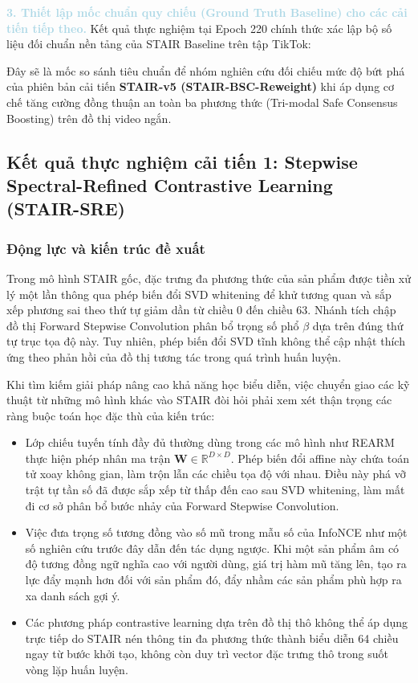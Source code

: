 \noindent\textcolor{lightblue}{\textbf{3. Thiết lập mốc chuẩn quy chiếu (Ground Truth Baseline) cho các cải tiến tiếp theo.}}
Kết quả thực nghiệm tại Epoch 220 chính thức xác lập bộ số liệu đối chuẩn nền tảng của STAIR Baseline trên tập TikTok:
\begin{center}
\end{center}
Đây sẽ là mốc so sánh tiêu chuẩn để nhóm nghiên cứu đối chiếu mức độ bứt phá của phiên bản cải tiến \textbf{STAIR-v5 (STAIR-BSC-Reweight)} khi áp dụng cơ chế tăng cường đồng thuận an toàn ba phương thức (Tri-modal Safe Consensus Boosting) trên đồ thị video ngắn.

\subsection{Kết quả thực nghiệm cải tiến 1: Stepwise Spectral-Refined Contrastive Learning (STAIR-SRE)}
\label{sec:stair_sre}

\subsubsection{Động lực và kiến trúc đề xuất}

Trong mô hình STAIR gốc, đặc trưng đa phương thức của sản phẩm được tiền xử lý một lần thông qua phép biến đổi SVD whitening để khử tương quan và sắp xếp phương sai theo thứ tự giảm dần từ chiều 0 đến chiều 63. Nhánh tích chập đồ thị Forward Stepwise Convolution phân bổ trọng số phổ $\beta$ dựa trên đúng thứ tự trục tọa độ này. Tuy nhiên, phép biến đổi SVD tĩnh không thể cập nhật thích ứng theo phản hồi của đồ thị tương tác trong quá trình huấn luyện.

Khi tìm kiếm giải pháp nâng cao khả năng học biểu diễn, việc chuyển giao các kỹ thuật từ những mô hình khác vào STAIR đòi hỏi phải xem xét thận trọng các ràng buộc toán học đặc thù của kiến trúc:
\begin{itemize}[leftmargin=*]
    \item Lớp chiếu tuyến tính đầy đủ thường dùng trong các mô hình như REARM thực hiện phép nhân ma trận $\mathbf{W} \in \mathbb{R}^{D \times D}$. Phép biến đổi affine này chứa toán tử xoay không gian, làm trộn lẫn các chiều tọa độ với nhau. Điều này phá vỡ trật tự tần số đã được sắp xếp từ thấp đến cao sau SVD whitening, làm mất đi cơ sở phân bổ bước nhảy của Forward Stepwise Convolution.
    \item Việc đưa trọng số tương đồng vào số mũ trong mẫu số của InfoNCE như một số nghiên cứu trước đây dẫn đến tác dụng ngược. Khi một sản phẩm âm có độ tương đồng ngữ nghĩa cao với người dùng, giá trị hàm mũ tăng lên, tạo ra lực đẩy mạnh hơn đối với sản phẩm đó, đẩy nhầm các sản phẩm phù hợp ra xa danh sách gợi ý.
    \item Các phương pháp contrastive learning dựa trên đồ thị thô không thể áp dụng trực tiếp do STAIR nén thông tin đa phương thức thành biểu diễn 64 chiều ngay từ bước khởi tạo, không còn duy trì vector đặc trưng thô trong suốt vòng lặp huấn luyện.
\end{itemize}

